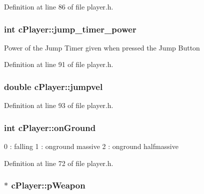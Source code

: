 Definition at line 86 of file player.\-h.

\hypertarget{classc_player_a7dfbe4472d1fd2eeb1949a13981885a7}{
\subsubsection[{jump\-\_\-timer\-\_\-power}]{\setlength{\rightskip}{0pt plus 5cm}int c\-Player\-::jump\-\_\-timer\-\_\-power}}\label{classc_player_a7dfbe4472d1fd2eeb1949a13981885a7}
Power of the Jump Timer given when pressed the Jump Button 

Definition at line 91 of file player.\-h.

\hypertarget{classc_player_a21af56625d269858e77fc61bc042cceb}{
\subsubsection[{jumpvel}]{\setlength{\rightskip}{0pt plus 5cm}double c\-Player\-::jumpvel}}\label{classc_player_a21af56625d269858e77fc61bc042cceb}


Definition at line 93 of file player.\-h.

\hypertarget{classc_player_a03db459aeafd05f9c9b8e90550336b42}{
\subsubsection[{on\-Ground}]{\setlength{\rightskip}{0pt plus 5cm}int c\-Player\-::on\-Ground}}\label{classc_player_a03db459aeafd05f9c9b8e90550336b42}
0 \-: falling 1 \-: onground massive 2 \-: onground halfmassive 

Definition at line 72 of file player.\-h.

\hypertarget{classc_player_a9a423c004d02e40cd589be2bcdcb5fc3}{
\subsubsection[{p\-Weapon}]{$\ast$ c\-Player\-::p\-Weapon}}\label{classc_player_a9a423c004d02e40cd589be2bcdcb5fc3}


